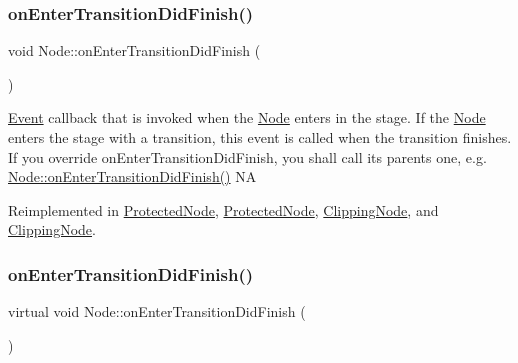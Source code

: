 \mbox{\label{classNode_afef4b2a863042a9ea456e952cf26991d}} 
\subsubsection{\texorpdfstring{on\+Enter\+Transition\+Did\+Finish()}{onEnterTransitionDidFinish()}\hspace{0.1cm}{\footnotesize\ttfamily [1/2]}}
{\footnotesize\ttfamily void Node\+::on\+Enter\+Transition\+Did\+Finish (\begin{DoxyParamCaption}{ }\end{DoxyParamCaption})\hspace{0.3cm}{\ttfamily [virtual]}}

\hyperlink{classEvent}{Event} callback that is invoked when the \hyperlink{classNode}{Node} enters in the \textquotesingle{}stage\textquotesingle{}. If the \hyperlink{classNode}{Node} enters the \textquotesingle{}stage\textquotesingle{} with a transition, this event is called when the transition finishes. If you override on\+Enter\+Transition\+Did\+Finish, you shall call its parent\textquotesingle{}s one, e.\+g. \hyperlink{classNode_afef4b2a863042a9ea456e952cf26991d}{Node\+::on\+Enter\+Transition\+Did\+Finish()}  NA 

Reimplemented in \hyperlink{classProtectedNode_aac8fcdaf79295aa56c9b792d2e4135d6}{Protected\+Node}, \hyperlink{classProtectedNode_ab424c044446f8c5cf2018e450c4df78c}{Protected\+Node}, \hyperlink{classClippingNode_ae083ddde34231495277586c7a8384262}{Clipping\+Node}, and \hyperlink{classClippingNode_a927d837090ada4bcdc8cedd40ef859f1}{Clipping\+Node}.

\mbox{\label{classNode_aa3a941a5ea551c52408a8f3df4a64e6f}} 
\subsubsection{\texorpdfstring{on\+Enter\+Transition\+Did\+Finish()}{onEnterTransitionDidFinish()}\hspace{0.1cm}{\footnotesize\ttfamily [2/2]}}
{\footnotesize\ttfamily virtual void Node\+::on\+Enter\+Transition\+Did\+Finish (\begin{DoxyParamCaption}{ }\end{DoxyParamCaption})\hspace{0.3cm}{\ttfamily [virtual]}}

